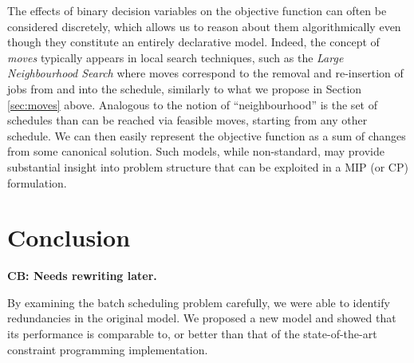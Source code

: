 \documentclass[oribibl]{llncs}
\begin{document}
The effects of binary decision variables on the objective function can often be
considered discretely, which allows us to reason about them algorithmically
even though they constitute an entirely declarative model.
Indeed, the concept of \textit{moves} typically appears
in local search techniques, such as the \textit{Large Neighbourhood
Search} \cite{shaw} where moves correspond to the removal and
re-insertion of jobs from and into the schedule, similarly to what
we propose in Section \ref{sec:moves} above. Analogous to the notion
of ``neighbourhood'' is the set of schedules than can be reached via
feasible moves, starting from any other schedule. We can then easily
represent the objective function as a sum of changes from
some canonical solution. Such models, while non-standard, may provide
substantial insight into problem structure that can be exploited in a
MIP (or CP) formulation.

\section{Conclusion} 
\label{sec:conclusion}

\textbf{CB: Needs rewriting later.}

By examining the batch scheduling problem carefully, we were able to identify
redundancies in the original model. We proposed a new model and showed that its
performance is comparable to, or better than that of the state-of-the-art
constraint programming implementation.

{}

\end{document}
